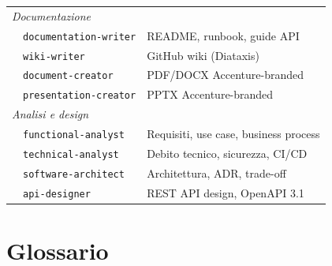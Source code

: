 \documentclass[12pt,a4paper,twoside]{book}
\begin{document}
\begin{longtable}{llp{7cm}}
\midrule
\multicolumn{3}{l}{\textit{Documentazione}} \\
 & \texttt{documentation-writer} & README, runbook, guide API \\
 & \texttt{wiki-writer} & GitHub wiki (Diataxis) \\
 & \texttt{document-creator} & PDF/DOCX Accenture-branded \\
 & \texttt{presentation-creator} & PPTX Accenture-branded \\
\midrule
\multicolumn{3}{l}{\textit{Analisi e design}} \\
 & \texttt{functional-analyst} & Requisiti, use case, business process \\
 & \texttt{technical-analyst} & Debito tecnico, sicurezza, CI/CD \\
 & \texttt{software-architect} & Architettura, ADR, trade-off \\
 & \texttt{api-designer} & REST API design, OpenAPI 3.1 \\
\bottomrule
\end{longtable}

\chapter{Glossario}
\end{document}
